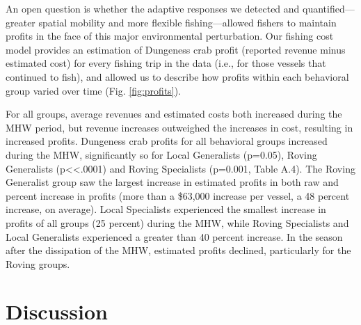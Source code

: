 \documentclass[]{elsarticle} %
\begin{document}
An open question is whether the adaptive responses we detected and
quantified---greater spatial mobility and more flexible
fishing---allowed fishers to maintain profits in the face of this major
environmental perturbation. Our fishing cost model provides an
estimation of Dungeness crab profit (reported revenue minus estimated
cost) for every fishing trip in the data (i.e., for those vessels that
continued to fish), and allowed us to describe how profits within each
behavioral group varied over time (Fig. \ref{fig:profits}).

For all groups, average revenues and estimated costs both increased
during the MHW period, but revenue increases outweighed the increases in
cost, resulting in increased profits. Dungeness crab profits for all
behavioral groups increased during the MHW, significantly so for Local
Generalists (p=0.05), Roving Generalists (p\textless\textless.0001) and
Roving Specialists (p=0.001, Table A.4). The Roving Generalist group saw
the largest increase in estimated profits in both raw and percent
increase in profits (more than a \$63,000 increase per vessel, a 48
percent increase, on average). Local Specialists experienced the
smallest increase in profits of all groups (25 percent) during the MHW,
while Roving Specialists and Local Generalists experienced a greater
than 40 percent increase. In the season after the dissipation of the
MHW, estimated profits declined, particularly for the Roving groups.

\hypertarget{discussion}{%
\section{Discussion}\label{discussion}}
\end{document}
